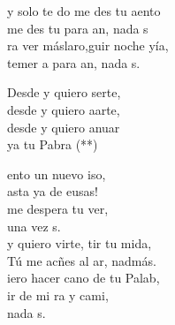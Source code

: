\begin{cancion}%
	y solo te do  me des tu aento\\
	 me des tu  para an, nada s \\
	ra ver máslaro,guir noche yía,\\
	temer a  para an, nada s. \jump\\
	\begin{chorus}%
		Desde y quiero serte,\\
		desde y quiero aarte,\\
		desde y quiero anuar\\
		ya tu Pabra (**)\jump\\
	\end{chorus}%
	ento un nuevo iso,\\
	asta ya de eusas!\\
	me despera tu ver,\\
	una vez s. \\
	\jump
	y quiero virte, tir tu mida,\\
	 Tú me acñes al ar, nadmás.\\
	iero hacer cano de tu Palab,\\
	ir de mi ra y cami,\\
	nada s. \\
\end{cancion}%
